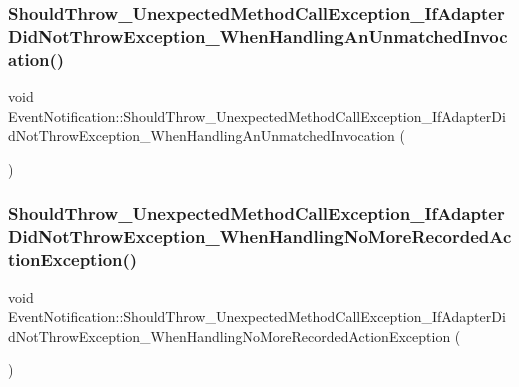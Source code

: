 \subsubsection{\texorpdfstring{ShouldThrow\_UnexpectedMethodCallException\_IfAdapterDidNotThrowException\_WhenHandlingAnUnmatchedInvocation()}{ShouldThrow\_UnexpectedMethodCallException\_IfAdapterDidNotThrowException\_WhenHandlingAnUnmatchedInvocation()}}
{\footnotesize\ttfamily void Event\+Notification\+::\+Should\+Throw\+\_\+\+Unexpected\+Method\+Call\+Exception\+\_\+\+If\+Adapter\+Did\+Not\+Throw\+Exception\+\_\+\+When\+Handling\+An\+Unmatched\+Invocation (\begin{DoxyParamCaption}{ }\end{DoxyParamCaption})\hspace{0.3cm}{\ttfamily [inline]}}

\mbox{\label{structEventNotification_a6239681a306e7ff7240cd6daf8e39795}} 
\subsubsection{\texorpdfstring{ShouldThrow\_UnexpectedMethodCallException\_IfAdapterDidNotThrowException\_WhenHandlingNoMoreRecordedActionException()}{ShouldThrow\_UnexpectedMethodCallException\_IfAdapterDidNotThrowException\_WhenHandlingNoMoreRecordedActionException()}}
{\footnotesize\ttfamily void Event\+Notification\+::\+Should\+Throw\+\_\+\+Unexpected\+Method\+Call\+Exception\+\_\+\+If\+Adapter\+Did\+Not\+Throw\+Exception\+\_\+\+When\+Handling\+No\+More\+Recorded\+Action\+Exception (\begin{DoxyParamCaption}{ }\end{DoxyParamCaption})\hspace{0.3cm}{\ttfamily [inline]}}

\mbox{\label{structEventNotification_a5e85ce3dd7d7525e6f72d21a584c78bd}} 

